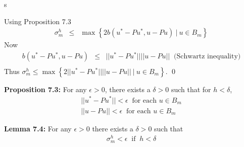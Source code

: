 s\documentclass[../../main.tex]{subfiles}
\begin{document}
Using Proposition 7.3
\begin{eqnarray*}
\sigma_{m}^{h} &\leq & \max\left\{ 2b(u^{*} - Pu^{*}, u -Pu) \ | \ u \in B_{m} \right \}			
\end{eqnarray*}
Now
\begin{eqnarray*}
b(u^{*} - Pu^{*}, u -Pu) & \leq & ||u^{*} - Pu^{*}||||u -Pu|| \ \textrm{ (Schwartz inequality)} \\
\end{eqnarray*}
Thus  $\sigma_{m}^{h} \leq \max \left\{2||u^{*}- Pu^{*}|| ||u-Pu|| \ | \ u \in B_{m} \right\}$. \qed


\textbf{Proposition 7.3:} For any $\epsilon > 0$, there exists a $\delta >0$ such that for $h<\delta$,
\begin{eqnarray*}
||u^{*} - Pu^{*}|| < \epsilon \ \textrm{ for each } u \in B_{m}\\
||u - Pu|| < \epsilon \ \textrm{ for each } u \in B_{m}
\end{eqnarray*}

\begin{comment}
\textbf{Proof:}
Suppose we have a set of basis functions $\Phi \subset S^{h}$ such that each element in $\Phi$ has order k, i.e. for each $v \in \Phi$, $v^{(k)} = 0$. Now from the definition of the Rayleigh-Ritz Projection, we have that $Pu$ is the closest element in $S^{h}$ to $u$. In particular, $||u-Pu||\leq ||u-\Pi u||$, where $\Pi u$ is the interpolant of $u$ into $S^{h}$.\\


Now from, we use the Approximation Theorem, so that we have
\begin{eqnarray*}
||u - \Pi u|| \leq Ch^{k}||u^{(k)}||
\end{eqnarray*}
So for any $\epsilon > 0$, we can find a $\delta$ such that if $h<\delta$ then
\begin{eqnarray*}
||u - Pu|| \leq ||u - \Pi u|| \leq \epsilon
\end{eqnarray*}
A similar argument for $||u^{*} - Pu^{*}||$ proves the theorem.
\qed
\\
\end{comment}

\textbf{Lemma 7.4:} For any $\epsilon >0$ there exists a $\delta > 0$ such that
\begin{eqnarray*}
\sigma_{m}^{h} < \epsilon \ \textrm{ if } \ h < \delta
\end{eqnarray*}

\begin{comment}
\textbf{Proof:} For any $\epsilon > 0$ there exists a $\delta > 0$ such that if $h<\delta$, then
\begin{eqnarray*}
||u-Pu|| < \epsilon \ \textrm{ for each } \ u \in B_{m}
\end{eqnarray*}
This, together with Lemma 7.2 and Proposition 7.4 gives the result.\qed\\
\end{comment}
\end{document}
